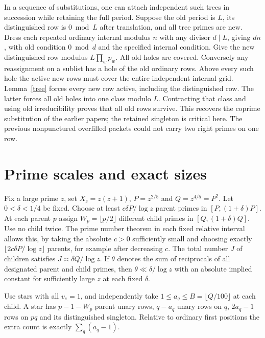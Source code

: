 \documentclass[11pt]{article}
\begin{document}
In a sequence of substitutions, one can attach independent such trees in succession while retaining the full period. Suppose the old period is $L$, its distinguished row is $0\bmod L$ after translation, and all tree primes are new. Dress each repeated ordinary internal modulus $n$ with any divisor $d\mid L$, giving $dn$, with old condition $0\bmod d$ and the specified internal condition. Give the new distinguished row modulus $L\prod_w p_w$. All old holes are covered. Conversely any reassignment on a sublist has a hole of the old ordinary rows. Above every such hole the active new rows must cover the entire independent internal grid. Lemma~\ref{tree} forces every new row active, including the distinguished row. The latter forces all old holes into one class modulo $L$. Contracting that class and using old irreducibility proves that all old rows survive. This recovers the coprime substitution of the earlier papers; the retained singleton is critical here. The previous nonpunctured overfilled packets could not carry two right primes on one row.

\section{Prime scales and exact sizes}
Fix a large prime $z$, set $X_z=z(z+1)$, $P=z^{2/5}$ and $Q=z^{4/5}=P^2$. Let $0<\delta<1/4$ be fixed. Choose at least $c\delta P/\log z$ parent primes in $[P,(1+\delta)P]$. At each parent $p$ assign $W_p=\lfloor p/2\rfloor$ different child primes in $[Q,(1+\delta)Q]$. Use no child twice. The prime number theorem in each fixed relative interval allows this, by taking the absolute $c>0$ sufficiently small and choosing exactly $\lfloor 2c\delta P/\log z\rfloor$ parents, for example after decreasing $c$. The total number $J$ of children satisfies $J\asymp\delta Q/\log z$. If $\theta$ denotes the sum of reciprocals of all designated parent and child primes, then $\theta\ll\delta/\log z$ with an absolute implied constant for sufficiently large $z$ at each fixed $\delta$.

Use stars with all $v_e=1$, and independently take $1\le a_q\le B=\lfloor Q/100\rfloor$ at each child. A star has $p-1-W_p$ parent unary rows, $q-a_q$ unary rows on $q$, $2a_q-1$ rows on $pq$ and its distinguished singleton. Relative to ordinary first positions the extra count is exactly $\sum_q(a_q-1)$.
\end{document}

